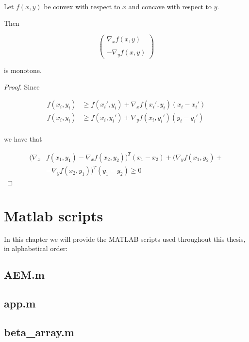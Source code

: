 \begin{theorem}
Let $f(x,y)$ be convex with respect to $x$ and concave with respect to $y$.

Then

$$\begin{pmatrix} \nabla_x f(x,y) \\
\\
-\nabla_y f(x,y) \end{pmatrix}$$

is monotone.

\begin{proof}

Since

\begin{align*}
f(x_i,y_i) &\geq f(x_i',y_i) + \nabla_x f(x_i',y_i) (x_i - x_i') \\
f(x_i,y_i) &\geq f(x_i,y_i') + \nabla_y f(x_i,y_i') (y_i - y_i') \\
\end{align*}

we have that

\begin{align*}
(\nabla_x &f(x_1,y_1) - \nabla_x f(x_2,y_2))^T (x_1-x_2) + (\nabla_y f(x_1,y_2) + \\
&- \nabla_y f(x_2,y_1))^T (y_1-y_2) \geq 0
\end{align*}
\end{proof}
\end{theorem}

\chapter{Matlab scripts}

In this chapter we will provide the MATLAB scripts used throughout this thesis, in alphabetical order:

\section{AEM.m}


\section{app.m}


\section{beta\_array.m}


